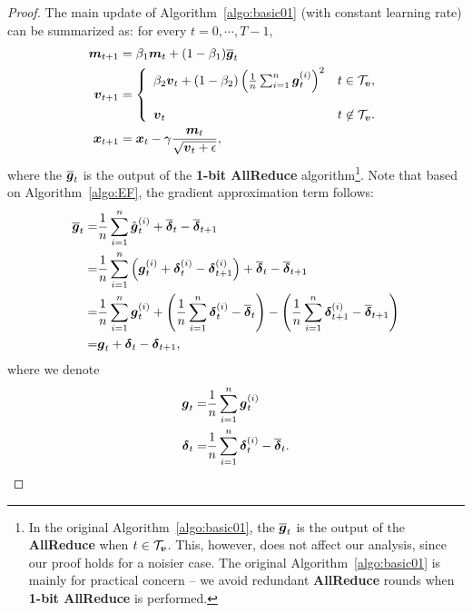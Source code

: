 \begin{proof}
The main update of Algorithm~\ref{algo:basic01} (with constant learning rate) can be summarized as: for every $t=0, \cdots, T-1$,
\begin{align*}
    \boldsymbol{m}_{t+1} & = \beta_1\boldsymbol{m}_{t} + (1-\beta_1)\overline{\boldsymbol{g}}_t \\
    \boldsymbol{v}_{t+1} & = \left\{
    \begin{array}{ll}
        \beta_2\boldsymbol{v}_{t} + (1-\beta_2)\left( \frac{1}{n}\sum_{i=1}^{n}\boldsymbol{g}^{(i)}_t \right)^2 & t\in\mathcal{T}_{\boldsymbol{v}}, \\
        \\
        \boldsymbol{v}_{t} & t\not\in\mathcal{T}_{\boldsymbol{v}}. \\
    \end{array}\right. \\
    \boldsymbol{x}_{t+1} & = \boldsymbol{x}_{t} - \gamma \frac{\boldsymbol{m}_t}{\sqrt{\boldsymbol{v}_t +  \epsilon} },
\end{align*}
where the $\overline{\boldsymbol{g}}_t$ is the output of the \textbf{1-bit AllReduce} algorithm\footnote{In the original Algorithm~\ref{algo:basic01}, the $\overline{\boldsymbol{g}}_t$ is the output of the \textbf{AllReduce} when $t\in\mathcal{T}_{\boldsymbol{v}}$. This, however, does not affect our analysis, since our proof holds for a noisier case. The original Algorithm~\ref{algo:basic01} is mainly for practical concern -- we avoid redundant \textbf{AllReduce} rounds when \textbf{1-bit AllReduce} is performed.}.
Note that based on Algorithm~\ref{algo:EF}, the gradient approximation term follows:
\begin{align*}
    \overline{\boldsymbol{g}}_{t} = & \frac{1}{n}\sum_{i=1}^{n}\hat{\boldsymbol{g}}^{(i)}_{t} + \overline{\boldsymbol{\delta}}_{t} - \overline{\boldsymbol{\delta}}_{t+1} \\
        = & \frac{1}{n}\sum_{i=1}^{n}\left( \boldsymbol{g}^{(i)}_{t} + \boldsymbol{\delta}^{(i)}_{t} - \boldsymbol{\delta}^{(i)}_{t+1} \right) + \overline{\boldsymbol{\delta}}_{t} - \overline{\boldsymbol{\delta}}_{t+1} \\
    = & \frac{1}{n}\sum_{i=1}^{n}\boldsymbol{g}^{(i)}_{t} + \left( \frac{1}{n}\sum_{i=1}^{n}\boldsymbol{\delta}^{(i)}_{t} - \overline{\boldsymbol{\delta}}_{t}\right) - \left( \frac{1}{n}\sum_{i=1}^{n}\boldsymbol{\delta}^{(i)}_{t+1} - \overline{\boldsymbol{\delta}}_{t+1}\right) \\
        = & \boldsymbol{g}_t + \boldsymbol{\delta}_{t} - \boldsymbol{\delta}_{t+1},
\end{align*}
where we denote
\begin{align*}
    \boldsymbol{g}_t = & \frac{1}{n}\sum_{i=1}^{n}\boldsymbol{g}^{(i)}_t \\
    \boldsymbol{\delta}_{t} = & \frac{1}{n}\sum_{i=1}^{n}\boldsymbol{\delta}^{(i)}_{t} - \overline{\boldsymbol{\delta}}_{t}.
\end{align*}

\end{proof}
